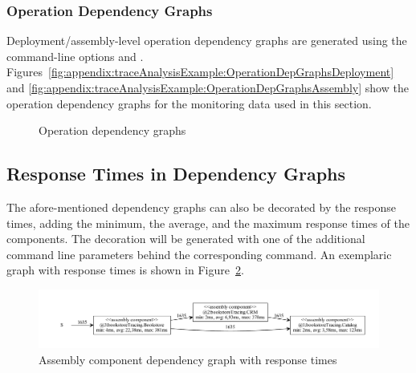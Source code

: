 \pagebreak

\subsubsection{Operation Dependency Graphs}

Deployment/assembly-level operation dependency graphs are generated using the %
command-line options \OPT{\OPTplotDeploymentOperationDependencyGraph} and %
\OPT{\OPTplotAssemblyOperationDependencyGraph}. %
Figures~\ref{fig:appendix:traceAnalysisExample:OperationDepGraphsDeployment} and %
\ref{fig:appendix:traceAnalysisExample:OperationDepGraphsAssembly} show the %
operation dependency graphs for the monitoring data used in this section. 

\begin{figure}[ht]\centering
{}
\caption{Operation dependency graphs}
\label{fig:appendix:traceAnalysisExample:OperationDepGraphs}
\end{figure}


\enlargethispage{1.5cm}

\subsection{Response Times in Dependency Graphs}

The afore-mentioned dependency graphs can also be decorated by the response times, adding the minimum, the average, %
and the maximum response times of the components. The decoration will be generated with one of the additional %
 command line parameters behind the corresponding command.  %
An exemplaric graph with response times is shown in Figure~\ref{fig:appendix:traceAnalysisExample:graphWithRespTimes}.

\begin{figure}[h]
\includegraphics[scale=0.45]{images/assemblyComponentDependencyGraphWithResponseTimes}
\caption{Assembly component dependency graph with response times}
\label{fig:appendix:traceAnalysisExample:graphWithRespTimes}
\end{figure}
   

